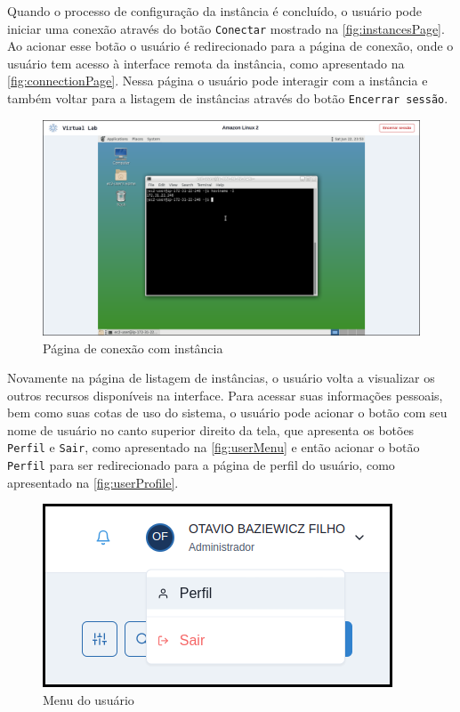 Quando o processo de configuração da instância é concluído, o usuário pode iniciar uma conexão através do botão \texttt{Conectar} mostrado na \autoref{fig:instancesPage}. Ao acionar esse botão o usuário é redirecionado para a página de conexão, onde o usuário tem acesso à interface remota da instância, como apresentado na \autoref{fig:connectionPage}. Nessa página o usuário pode interagir com a instância e também voltar para a listagem de instâncias através do botão \texttt{Encerrar sessão}.

\begin{figure}[H]
\caption{Página de conexão com instância}
\label{fig:connectionPage}
\includegraphics[width=\textwidth]{capitulos/3-resultados/files/connection.png}
\end{figure}


Novamente na página de listagem de instâncias, o usuário volta a visualizar os outros recursos disponíveis na interface. Para acessar suas informações pessoais, bem como suas cotas de uso do sistema, o usuário pode acionar o botão com seu nome de usuário no canto superior direito da tela, que apresenta os botões \texttt{Perfil} e \texttt{Sair}, como apresentado na \autoref{fig:userMenu} e então acionar o botão \texttt{Perfil} para ser redirecionado para a página de perfil do usuário, como apresentado na \autoref{fig:userProfile}.


\begin{figure}[H]
\caption{Menu do usuário}
\label{fig:userMenu}
\includegraphics[width=\textwidth]{capitulos/3-resultados/files/user-menu.png}
\end{figure}

